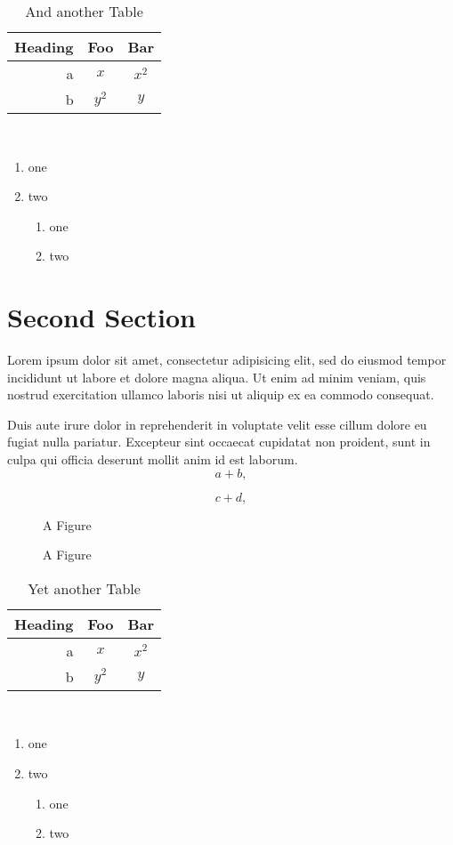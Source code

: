 \documentclass{book}
\begin{document}
\begin{table}
\begin{centering}
\begin{tabular}{r|cc}
Heading & Foo & Bar\\\hline
a & $x$ & $x^2$\\
b & $y^2$ & $y$\\
\end{tabular}\\
\end{centering}
\caption{And another Table}
\end{table}

\begin{enumerate}
 \item one
 \item two
   \begin{enumerate}
    \item one
    \item two
   \end{enumerate}
\end{enumerate}

\section{Second Section}
Lorem ipsum dolor sit amet, consectetur adipisicing elit, sed do eiusmod tempor incididunt ut labore et dolore magna aliqua. Ut enim ad minim veniam, quis nostrud exercitation ullamco laboris nisi ut aliquip ex ea commodo consequat.

Duis aute irure dolor in reprehenderit in voluptate velit esse cillum dolore eu fugiat nulla pariatur. Excepteur sint occaecat cupidatat non proident, sunt in culpa qui officia deserunt mollit anim id est laborum.
\begin{equation}
 a + b,
\end{equation}

\begin{equation}
 c + d,
\end{equation}

\begin{figure}
A Figure
\caption{A Figure}
\end{figure}

\begin{table}
\begin{centering}
\begin{tabular}{r|cc}
Heading & Foo & Bar\\\hline
a & $x$ & $x^2$\\
b & $y^2$ & $y$\\
\end{tabular}\\
\end{centering}
\caption{Yet another Table}
\end{table}

\begin{enumerate}
 \item one
 \item two
   \begin{enumerate}
    \item one
    \item two
   \end{enumerate}
\end{enumerate}
\end{document}
